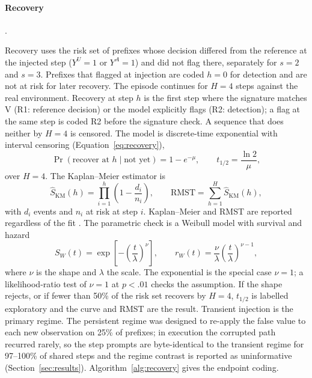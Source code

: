\documentclass[a4paper,fleqn]{cas-sc}
\begin{document}
\paragraph{Recovery}.\

Recovery uses the risk set of prefixes whose decision differed from the reference at the injected step ($Y^{U}=1$ or
$Y^{A}=1$) and did not flag there, separately for $s=2$ and $s=3$. Prefixes that flagged at
injection are coded $h=0$ for detection and are not at risk for later recovery. The episode
continues for $H=4$ steps against the real environment. Recovery at step $h$ is the first step
where the signature matches V (R1: reference decision) or the model explicitly flags (R2:
detection); a flag at the same step is coded R2 before the signature check. A sequence that does
neither by $H=4$ is censored. The model is discrete-time
exponential with interval censoring (Equation~\ref{eq:recovery}),
\begin{equation}
  \Pr(\text{recover at } h \mid \text{not yet}) = 1-e^{-\mu},
  \qquad
  t_{1/2} = \frac{\ln 2}{\mu},
  \label{eq:recovery}
\end{equation}
over $H=4$. The Kaplan--Meier estimator is
\begin{equation}
  \hat S_{\mathrm{KM}}(h) = \prod_{i=1}^{h}\left(1-\frac{d_i}{n_i}\right),\qquad
  \mathrm{RMST} = \sum_{h=1}^{H} \hat S_{\mathrm{KM}}(h),
  \label{eq:km}
\end{equation}
with $d_i$ events and $n_i$ at risk at step $i$. Kaplan--Meier and RMST are reported regardless
of the fit \cite{kaplan1958}. The parametric check is a Weibull model with survival and hazard
\begin{equation}
  S_{W}(t)=\exp\!\left[-\left(\frac{t}{\lambda}\right)^{\nu}\right],
  \qquad
  r_{W}(t)=\frac{\nu}{\lambda}\left(\frac{t}{\lambda}\right)^{\nu-1},
  \label{eq:weibull}
\end{equation}
where $\nu$ is the shape and $\lambda$ the scale. The exponential is the special case
$\nu=1$; a likelihood-ratio test of $\nu=1$ at $p<.01$ checks the assumption. If the shape
rejects, or if fewer than 50\% of the risk set recovers by $H=4$,
$t_{1/2}$ is labelled exploratory and the curve and RMST are the result. Transient injection is
the primary regime. The persistent regime was designed to re-apply the false value to each new
observation on 25\% of prefixes; in execution the corrupted path recurred rarely, so the step
prompts are byte-identical to the transient regime for 97--100\% of shared steps and the regime
contrast is reported as uninformative (Section~\ref{sec:results}). Algorithm~\ref{alg:recovery}
gives the endpoint coding.
\end{document}
